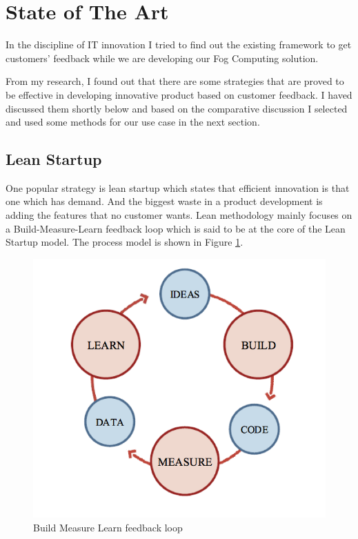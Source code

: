 
\section{State of The Art}
In the discipline of IT innovation I tried to find out the existing framework to get customers' feedback while we are developing our Fog Computing solution. 

From my research, I found out that there are some strategies that are proved to be effective in developing innovative product based on customer feedback. I haved discussed them shortly below and based on the comparative discussion I selected and used some methods for our use case in the next section.

\subsection{Lean Startup}

One popular strategy is lean startup \citep{leanstartup} which states that efficient innovation is that one which has demand. And the biggest waste in a product development is adding the features that no customer wants. Lean methodology mainly focuses on a  Build-Measure-Learn feedback loop which is said to be at the core of the Lean Startup model\cite[p.~70]{leanstartup}. The process model is shown in Figure \ref{img:leanloop}.  

\begin{figure}[H]
  \centering
  \includegraphics[width=.45\textwidth]{img/build-measure-learn.png}
  \caption{Build Measure Learn feedback loop  \cite[p.~70]{leanstartup}}\label{img:leanloop}
\end{figure}
 
